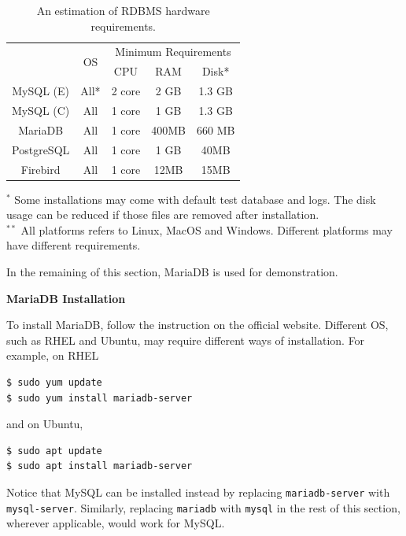 \begin{table}
	\centering \caption{An estimation of RDBMS hardware requirements.} \label{ch:db:tab:rdbrequirements}
	\begin{tabular}{|c|c|c|c|c|}
		\hline
		 & \multirow{2}{*}{OS} & \multicolumn{3}{c|}{Minimum Requirements} \\ \cline{3-5}
		 & & CPU & RAM & Disk* \\ \hline
		 MySQL (E) & All* & 2 core & 2 GB & 1.3 GB \\ \hline
		 MySQL (C) & All & 1 core & 1 GB & 1.3 GB \\ \hline
		 MariaDB & All & 1 core & 400MB & 660 MB \\ \hline
		 PostgreSQL & All & 1 core & 1 GB & 40MB \\ \hline
		 Firebird & All & 1 core & 12MB & 15MB \\ \hline
	\end{tabular}
	\begin{flushleft}
	\footnotesize
	$^{*}$ Some installations may come with default test database and logs. The disk usage can be reduced if those files are removed after installation. \\
	$^{**}$ All platforms refers to Linux, MacOS and Windows. Different platforms may have different requirements. \\
    \end{flushleft}
\end{table}

In the remaining of this section, MariaDB is used for demonstration.

\vspace{0.1in}
\noindent \textbf{MariaDB Installation}
\vspace{0.1in}

To install MariaDB, follow the instruction on the official website. Different OS, such as RHEL and Ubuntu, may require different ways of installation. For example, on RHEL
\begin{lstlisting}
$ sudo yum update
$ sudo yum install mariadb-server
\end{lstlisting}
and on Ubuntu,
\begin{lstlisting}
$ sudo apt update
$ sudo apt install mariadb-server
\end{lstlisting}
Notice that MySQL can be installed instead by replacing \verb|mariadb-server| with \verb|mysql-server|. Similarly, replacing \verb|mariadb| with \verb|mysql| in the rest of this section, wherever applicable, would work for MySQL.

